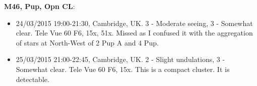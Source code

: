 {\bf M46, Pup, Opn CL}:
\begin{itemize}
\item 24/03/2015 19:00-21:30, Cambridge, UK. 3 - Moderate seeing, 3 - Somewhat clear. Tele Vue 60 F6, 15x, 51x. Missed as I confused it with the aggregation of stars at North-West of 2 Pup A and 4 Pup. 
\item 25/03/2015 21:00-22:45, Cambridge, UK. 2 - Slight undulations, 3 - Somewhat clear. Tele Vue 60 F6, 15x. This is a compact cluster. It is detectable. 
\end{itemize}
